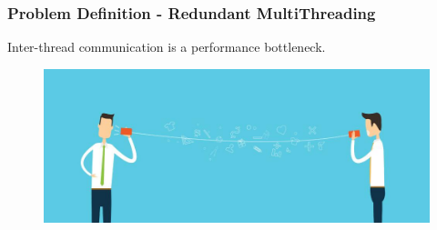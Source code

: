 \documentclass[xcolor=pdftex,dvipsnames,table]{beamer}
\begin{document}
\begin{frame}
	\frametitle{Problem Definition - Redundant MultiThreading}	
	\begin{center}
		Inter-thread communication is a performance bottleneck.
	\end{center}    
	\begin{figure}[H]
    	\begin{center}
        	\includegraphics[scale=0.35]{CommunicationCostMirror.jpg}
    	\end{center}
   	\end{figure}  
\end{frame}

	
\end{document}
